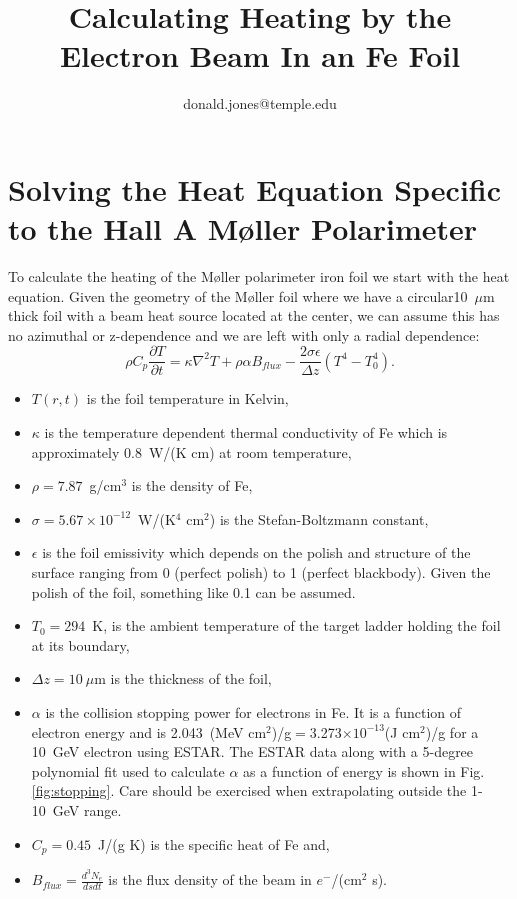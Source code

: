 \documentclass[12pt]{article}
\title{\color{BlueViolet}\bfseries\Huge Calculating Heating by the Electron Beam In an Fe Foil}
\author{\color{BurntOrange}donald.jones@temple.edu}
\date{}
\begin{document}
\maketitle
\section{Solving the Heat Equation Specific to the Hall A M\o ller Polarimeter}
To calculate the heating of the M\o ller polarimeter iron foil we start with the heat equation. Given the geometry of the M\o ller foil where we have a circular10~$\mu$m thick foil with a beam heat source located at the center, we can assume this has no azimuthal or z-dependence and we are left with only a radial dependence:
\begin{equation}
\label{eq:heat_T_r_t}
\rho C_p\frac{\partial T}{\partial t}=\kappa\nabla^2T+\rho\alpha B_{flux}-\frac{2\sigma\epsilon}{\Delta z}\left(T^4-T_0^4\right).
\end{equation}
\begin{itemize}
\item{$T(r, t)$ is the foil temperature in Kelvin,}
\item{$\kappa$ is the temperature dependent thermal conductivity of Fe which is approximately 0.8~W/(K cm) at room temperature,}
\item{$\rho =7.87$~g/cm$^3$ is the density of Fe,}
\item{$\sigma =5.67\times 10^{-12}$~W/(K$^4$ cm$^2$) is the Stefan-Boltzmann constant,}
\item{$\epsilon$ is the foil emissivity which depends on the polish and structure of the surface ranging from 0 (perfect polish) to 1 (perfect blackbody). Given the polish of the foil, something like 0.1 can be assumed.}
\item{$T_0=294$~K, is the ambient temperature of the target ladder holding the foil at its boundary,}
\item{$\Delta z=10~\mu$m is the thickness of the foil,}
\item{$\alpha$ is the collision stopping power for electrons in Fe. It is a function of electron energy and is 2.043~(MeV cm$^2$)/g$=$3.273$\times 10^{-13}$(J cm$^2$)/g for a 10~GeV electron using ESTAR. The ESTAR data along with a 5-degree polynomial fit used to calculate $\alpha$ as a function of energy is shown in Fig. \ref{fig:stopping}. Care should be exercised when extrapolating outside the 1-10~GeV range.}
\item{$C_p=0.45$~J/(g K) is the specific heat of Fe and,} 
\item{$B_{flux}=\frac{d^3N_e}{ds dt} $ is the flux density of the beam in $e^-$/(cm$^2$ s).}
\end{itemize}
\end{document}
